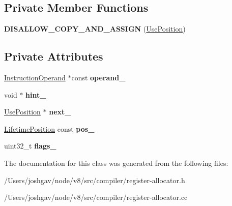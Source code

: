 \subsection*{Private Member Functions}
\begin{DoxyCompactItemize}
\item 
{\bfseries D\+I\+S\+A\+L\+L\+O\+W\+\_\+\+C\+O\+P\+Y\+\_\+\+A\+N\+D\+\_\+\+A\+S\+S\+I\+GN} (\hyperlink{classv8_1_1internal_1_1compiler_1_1_use_position}{Use\+Position})\hypertarget{classv8_1_1internal_1_1compiler_1_1_use_position_ad8c0d91e9a1e00a199f2f5112502151c}{}\label{classv8_1_1internal_1_1compiler_1_1_use_position_ad8c0d91e9a1e00a199f2f5112502151c}

\end{DoxyCompactItemize}
\subsection*{Private Attributes}
\begin{DoxyCompactItemize}
\item 
\hyperlink{classv8_1_1internal_1_1compiler_1_1_instruction_operand}{Instruction\+Operand} $\ast$const {\bfseries operand\+\_\+}\hypertarget{classv8_1_1internal_1_1compiler_1_1_use_position_a855869caebafc1af61892f1ac1b95b82}{}\label{classv8_1_1internal_1_1compiler_1_1_use_position_a855869caebafc1af61892f1ac1b95b82}

\item 
void $\ast$ {\bfseries hint\+\_\+}\hypertarget{classv8_1_1internal_1_1compiler_1_1_use_position_a42f60d27bb855b4f1d74a6ef637f2f3d}{}\label{classv8_1_1internal_1_1compiler_1_1_use_position_a42f60d27bb855b4f1d74a6ef637f2f3d}

\item 
\hyperlink{classv8_1_1internal_1_1compiler_1_1_use_position}{Use\+Position} $\ast$ {\bfseries next\+\_\+}\hypertarget{classv8_1_1internal_1_1compiler_1_1_use_position_a1b2c2ad90f10b92c352409cc1c40871f}{}\label{classv8_1_1internal_1_1compiler_1_1_use_position_a1b2c2ad90f10b92c352409cc1c40871f}

\item 
\hyperlink{classv8_1_1internal_1_1compiler_1_1_lifetime_position}{Lifetime\+Position} const {\bfseries pos\+\_\+}\hypertarget{classv8_1_1internal_1_1compiler_1_1_use_position_a95501ad115a667e3ba4607989fb10080}{}\label{classv8_1_1internal_1_1compiler_1_1_use_position_a95501ad115a667e3ba4607989fb10080}

\item 
uint32\+\_\+t {\bfseries flags\+\_\+}\hypertarget{classv8_1_1internal_1_1compiler_1_1_use_position_aa3c0c6912c9475312bf608d38e37df53}{}\label{classv8_1_1internal_1_1compiler_1_1_use_position_aa3c0c6912c9475312bf608d38e37df53}

\end{DoxyCompactItemize}


The documentation for this class was generated from the following files\+:\begin{DoxyCompactItemize}
\item 
/\+Users/joshgav/node/v8/src/compiler/register-\/allocator.\+h\item 
/\+Users/joshgav/node/v8/src/compiler/register-\/allocator.\+cc\end{DoxyCompactItemize}
